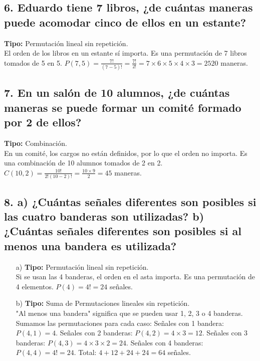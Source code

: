 \documentclass[11pt]{article}
\begin{document}
    \subsection*{6. Eduardo tiene 7 libros, ¿de cuántas maneras puede acomodar cinco de ellos en un estante?}
    \textbf{Tipo:} Permutación lineal sin repetición. \\
    El orden de los libros en un estante sí importa. Es una permutación de 7 libros tomados de 5 en 5.
    $P(7,5) = \frac{7!}{(7-5)!} = \frac{7!}{2!} = 7 \times 6 \times 5 \times 4 \times 3 = 2520$ maneras.

    \subsection*{7. En un salón de 10 alumnos, ¿de cuántas maneras se puede formar un comité formado por 2 de ellos?}
    \textbf{Tipo:} Combinación. \\
    En un comité, los cargos no están definidos, por lo que el orden no importa. Es una combinación de 10 alumnos tomados de 2 en 2.
    $C(10,2) = \frac{10!}{2!(10-2)!} = \frac{10 \times 9}{2} = 45$ maneras.

    \subsection*{8. a) ¿Cuántas señales diferentes son posibles si las cuatro banderas son utilizadas? b) ¿Cuántas señales diferentes son posibles si al menos una bandera es utilizada?}
    \begin{itemize}
        \item[a)] \textbf{Tipo:} Permutación lineal sin repetición. \\
        Si se usan las 4 banderas, el orden en el asta importa. Es una permutación de 4 elementos. $P(4) = 4! = 24$ señales.
        \item[b)] \textbf{Tipo:} Suma de Permutaciones lineales sin repetición. \\
        "Al menos una bandera" significa que se pueden usar 1, 2, 3 o 4 banderas. Sumamos las permutaciones para cada caso:
        Señales con 1 bandera: $P(4,1) = 4$.
        Señales con 2 banderas: $P(4,2) = 4 \times 3 = 12$.
        Señales con 3 banderas: $P(4,3) = 4 \times 3 \times 2 = 24$.
        Señales con 4 banderas: $P(4,4) = 4! = 24$.
        Total: $4 + 12 + 24 + 24 = 64$ señales.
    \end{itemize}
\end{document}
